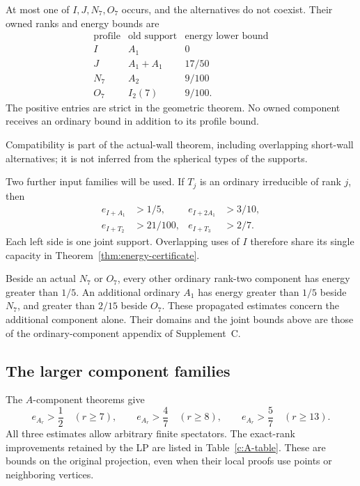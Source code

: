 \begin{proposition}
\label{c:defect-input}
At most one of $I,J,N_7,O_7$ occurs, and the alternatives do not coexist.
Their owned ranks and energy bounds are
\[
\begin{array}{c|c|c}
\text{profile}&\text{old support}&\text{energy lower bound}\\\hline
I&A_1&0\\
J&A_1+A_1&17/50\\
N_7&A_2&9/100\\
O_7&I_2(7)&9/100.
\end{array}
\]
The positive entries are strict in the geometric theorem. No owned
component receives an ordinary bound in addition to its profile bound.
\end{proposition}

Compatibility is part of the actual-wall theorem, including overlapping
short-wall alternatives; it is not inferred from the spherical types
of the supports.

Two further input families will be used. If $T_j$ is an ordinary
irreducible of rank $j$, then
\begin{align}
 e_{I+A_1}&>1/5,&
 e_{I+2A_1}&>3/10,\label{c:I-joint-one}\\
 e_{I+T_2}&>21/100,&
 e_{I+T_3}&>2/7.\label{c:I-joint-two}
\end{align}
Each left side is one joint support. Overlapping uses of $I$ therefore
share its single capacity in Theorem~\ref{thm:energy-certificate}.

Beside an actual $N_7$ or $O_7$, every other ordinary rank-two component
has energy greater than $1/5$. An additional ordinary $A_1$ has energy
greater than $1/5$ beside $N_7$, and greater than $2/15$ beside $O_7$.
These propagated estimates concern the additional component alone.
Their domains and the joint bounds above are those of the
ordinary-component appendix of Supplement~C.

\subsection{The larger component families}
\label{c:large}

The $A$-component theorems give
\begin{equation}\label{c:A-thresholds}
 e_{A_r}>\frac12\quad(r\ge7),\qquad
 e_{A_r}>\frac47\quad(r\ge8),\qquad
 e_{A_r}>\frac57\quad(r\ge13).
\end{equation}
All three estimates allow arbitrary finite spectators. The exact-rank
improvements retained by the LP are listed in
Table~\ref{c:A-table}. These are bounds on the original projection,
even when their local proofs use points or neighboring vertices.

